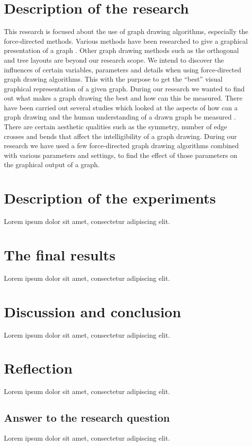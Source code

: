 \documentclass[a4paper,12pt,twoside]{article}
\begin{document}
\section{Description of the research}
This research is focused about the use of graph drawing algorithms, especially the force-directed methods. Various methods have been researched to give a graphical presentation of a graph \cite{Ioannis G Tollis}. Other graph drawing methods such as the orthogonal and tree layouts are beyond our research scope. We intend to discover the influences of certain variables, parameters and details when using force-directed graph drawing algorithms. This with the purpose to get the “best” visual graphical representation of a given graph. During our research we wanted to find out what makes a graph drawing the best and how can this be measured.\newline
There have been carried out several studies which looked at the aspects of how can a graph drawing and the human understanding of a drawn graph be measured \cite{Purchase}. There are certain aesthetic qualities such as the symmetry, number of edge crosses and bends that affect the intelligibility of a graph drawing. During our research we have used a few force-directed graph drawing algorithms combined with various parameters and settings, to find the effect of those parameters on the graphical output of a graph.

\section{Description of the experiments}
Lorem ipsum dolor sit amet, consectetur adipiscing elit.

\section{The final results}
Lorem ipsum dolor sit amet, consectetur adipiscing elit.

\section{Discussion and conclusion}
Lorem ipsum dolor sit amet, consectetur adipiscing elit.

\section{Reflection}
Lorem ipsum dolor sit amet, consectetur adipiscing elit.
\subsection{Answer to the research question}
Lorem ipsum dolor sit amet, consectetur adipiscing elit.
\end{document}
